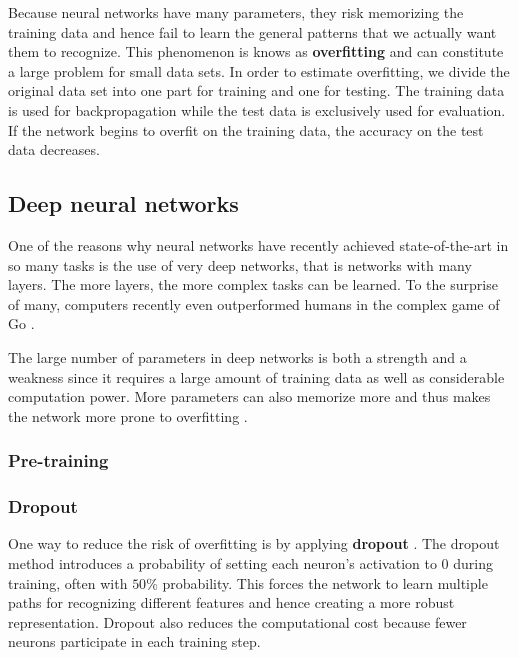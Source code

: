Because neural networks have many parameters, they risk memorizing the training data and hence fail to learn the general patterns that we actually want them to recognize.
This phenomenon is knows as \textbf{overfitting} and can constitute a large problem for small data sets. In order to estimate overfitting, we divide the original data set into one part for training and one for testing. The training data is used for backpropagation while the test data is exclusively used for evaluation. If the network begins to overfit on the training data, the accuracy on the test data decreases.


\subsection{Deep neural networks}

One of the reasons why neural networks have recently achieved state-of-the-art in so many tasks is the use of very deep networks, that is networks with many layers.
The more layers, the more complex tasks can be learned. To the surprise of many, computers recently even outperformed humans in the complex game of Go \cite{AlphaGo, AlphaGoTuringTest}.

The large number of parameters in deep networks is both a strength and a weakness since it requires a large amount of training data as well as considerable computation power. More parameters can also memorize more and thus makes the network more prone to overfitting \cite{AlexNet}.

\subsubsection{Pre-training}


\subsubsection{Dropout}

One way to reduce the risk of overfitting is by applying \textbf{dropout}  \cite{AlexNet, FornesCnnCategorization}.
The dropout method introduces a probability of setting each neuron's activation to $0$ during training, often with $50\%$ probability. This forces the network to learn multiple paths for recognizing different features and hence creating a more robust representation. Dropout also reduces the computational cost because fewer neurons participate in each training step.

